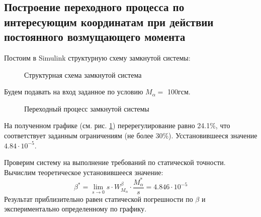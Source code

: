\documentclass[main.tex]{subfiles}
\begin{document}
\subsection{Построение переходного процесса по интересующим координатам при
действии постоянного возмущающего момента}
Постоим в Simulink структурную схему замкнутой системы:
\begin{figure}[h]
    \caption{Структурная схема замкнутой система}
\end{figure}

Будем подавать на вход заданное по условию \( M_\alpha= \) 100гсм.
\begin{figure}[h]
    \caption{Переходный процесс замкнутой системы}
    \label{fig:p7_pp_corrected}
\end{figure}
На полученном графике (см. рис. \ref{fig:p7_pp_corrected}) перерегулирование равно 24.1\%, что соответствует заданным
ограничениям (не более 30\%). Усстановившееся значение \( 4.84 \cdot 10^{-5} \).

Проверим систему на выполнение требований по статической точности. Вычислим
теоретическое установившееся значение:
\[ \beta^* = \lim\limits_{s\rightarrow 0} s\cdot W_{M_\alpha}^\beta \cdot \frac{M_\alpha^*}{s} = 
 4.846 \cdot 10^{-5}\]
 Результат приблизительно равен статической погрешности по \( \beta \) и \\
 экспериментально определенному по графику.
\end{document}
